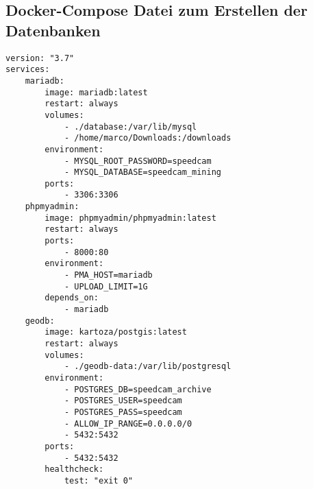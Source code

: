 \subsection{Docker-Compose Datei zum Erstellen der Datenbanken}
\label{sec:AnhangDockerCompose}

\begin{code}
\begin{verbatim}
version: "3.7"
services:
    mariadb:
        image: mariadb:latest
        restart: always
        volumes:
            - ./database:/var/lib/mysql
            - /home/marco/Downloads:/downloads
        environment:
            - MYSQL_ROOT_PASSWORD=speedcam
            - MYSQL_DATABASE=speedcam_mining
        ports:
            - 3306:3306
    phpmyadmin:
        image: phpmyadmin/phpmyadmin:latest
        restart: always
        ports:
            - 8000:80
        environment:
            - PMA_HOST=mariadb
            - UPLOAD_LIMIT=1G
        depends_on:
            - mariadb
    geodb:
        image: kartoza/postgis:latest
        restart: always
        volumes:
            - ./geodb-data:/var/lib/postgresql
        environment:
            - POSTGRES_DB=speedcam_archive
            - POSTGRES_USER=speedcam
            - POSTGRES_PASS=speedcam
            - ALLOW_IP_RANGE=0.0.0.0/0
            - 5432:5432
        ports:
            - 5432:5432
        healthcheck:
            test: "exit 0"
\end{verbatim}
\label{lst:DockerComposeDBs}
\end{code}
